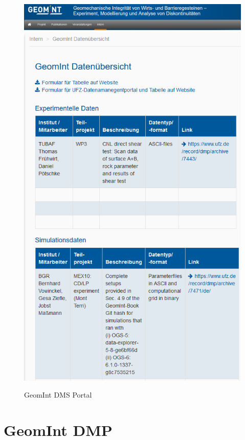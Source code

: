 \begin{figure}[!ht]
\includegraphics[width=\textwidth]{figures/geomint-web-01.png}
\includegraphics[width=\textwidth]{figures/geomint-web-02.png}
\caption{GeomInt DMS Portal}
\label{fig:geomint-web}
\end{figure}

\section{GeomInt DMP}

